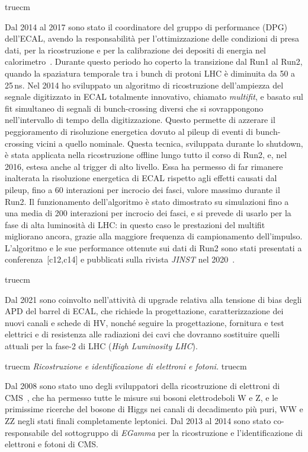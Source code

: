 \documentclass[11pt,twoside,a4paper]{article}
\begin{document}
 truecm

Dal 2014 al 2017 sono stato il coordinatore del gruppo di performance
(DPG) dell'ECAL, avendo la responsabilit\`a per l'ottimizzazione delle
condizioni di presa dati, per la ricostruzione e per la calibrazione
dei depositi di energia nel
calorimetro~\cite{Khachatryan:2015iwa}. Durante questo periodo ho
coperto la transizione dal Run1 al Run2, quando la spaziatura
temporale tra i bunch di protoni LHC \`e diminuita da 50 a 25\,ns. Nel
2014 ho sviluppato un algoritmo di ricostruzione dell'ampiezza del
segnale digitizzato in ECAL totalmente innovativo, chiamato
\textit{multifit}, e basato sul fit simultaneo di segnali di
bunch-crossing diversi che si sovrappongono nell'intervallo di tempo
della digitizzazione.  Questo permette di azzerare il peggioramento di
risoluzione energetica dovuto al pileup di eventi di bunch-crossing
vicini a quello nominale.  Questa tecnica, sviluppata durante lo
shutdown, \`e stata applicata nella ricostruzione offline lungo tutto
il corso di Run2, e, nel 2016, estesa anche al trigger di alto
livello.  Essa ha permesso di far rimanere inalterata la risoluzione
energetica di ECAL rispetto agli effetti causati dal pileup, fino a 60
interazioni per incrocio dei fasci, valore massimo durante il Run2.
Il funzionamento dell'algoritmo \`e stato dimostrato su simulazioni
fino a una media di 200 interazioni per incrocio dei fasci, e si
prevede di usarlo per la fase di alta luminosit\`a di LHC: in questo
caso le prestazioni del multifit migliorano ancora, grazie alla
maggiore frequenza di campionamento dell'impulso. L'algoritmo e le sue
performance ottenute sui dati di Run2 sono stati presentati a
conferenza~[c12,c14] e pubblicati sulla rivista \textit{JINST} nel
2020~\cite{CMS:2020xlg}.

 truecm

Dal 2021 sono coinvolto nell'attivit\`a di upgrade relativa alla
tensione di bias degli APD del barrel di ECAL, che richiede la
progettazione, caratterizzazione dei nuovi canali e schede di HV,
nonch\'e seguire la progettazione, fornitura e test elettrici e di
resistenza alle radiazioni dei cavi che dovranno sostituire quelli
attuali per la fase-2 di LHC (\textit{High Luminosity LHC}).


 truecm
\textit{Ricostruzione e identificazione di elettroni e fotoni.}
 truecm

Dal 2008 sono stato uno degli sviluppatori della ricostruzione di
elettroni di CMS~\cite{Khachatryan:2015hwa}, che ha permesso tutte le
misure sui bosoni elettrodeboli W e Z, e le primissime ricerche del
bosone di Higgs nei canali di decadimento pi\`u puri, WW e ZZ negli
stati finali completamente leptonici. Dal 2013 al 2014 sono stato
co-responsabile del sottogruppo di \textit{EGamma} per la
ricostruzione e l'identificazione di elettroni e fotoni di CMS.
\end{document}
